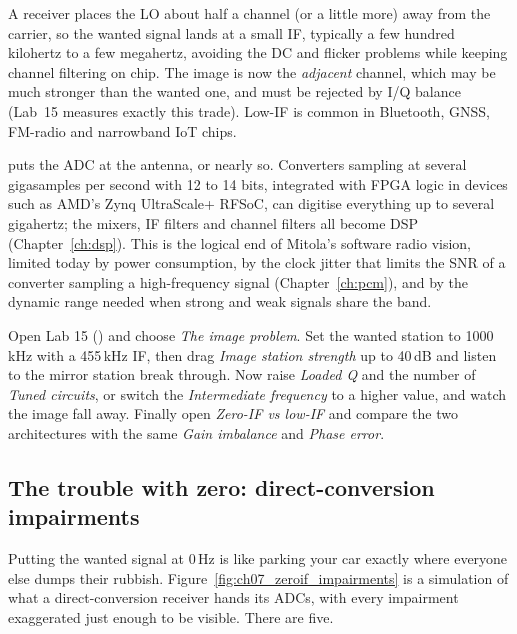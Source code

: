 A  receiver places the LO about half a channel (or a little more) away from the carrier, so
the wanted signal lands at a small IF, typically a few hundred kilohertz to a few megahertz, avoiding
the DC and flicker problems while keeping channel filtering on chip. The image is now the
\emph{adjacent} channel, which may be much stronger than the wanted one, and must be rejected by I/Q
balance (Lab~15 measures exactly this trade). Low-IF is common in Bluetooth, GNSS, FM-radio and
narrowband IoT chips.

 puts the ADC at the antenna, or nearly so. Converters sampling at several
gigasamples per second with 12 to 14 bits, integrated with FPGA logic in devices such as AMD's
Zynq UltraScale+ RFSoC, can digitise everything up to several gigahertz; the mixers, IF filters and
channel filters all become DSP (Chapter~\ref{ch:dsp}). This is the logical end of Mitola's software radio
vision, limited today by power consumption, by the clock jitter that limits the SNR of a converter
sampling a high-frequency signal (Chapter~\ref{ch:pcm}), and by the dynamic range needed when strong and
weak signals share the band.

\begin{tryit}
Open Lab 15 () and choose \emph{The image problem}. Set the wanted
station to 1000\,kHz with a 455\,kHz IF, then drag \emph{Image station strength} up to 40\,dB and
listen to the mirror station break through. Now raise \emph{Loaded Q} and the number of
\emph{Tuned circuits}, or switch the \emph{Intermediate frequency} to a higher value, and watch the
image fall away. Finally open \emph{Zero-IF vs low-IF} and compare the two architectures with the same
\emph{Gain imbalance} and \emph{Phase error}.
\end{tryit}

\subsection{The trouble with zero: direct-conversion impairments}
\label{sec:ch07:zeroif}

Putting the wanted signal at 0\,Hz is like parking your car exactly where everyone else dumps their
rubbish. Figure~\ref{fig:ch07_zeroif_impairments} is a simulation of what a direct-conversion receiver
hands its ADCs, with every impairment exaggerated just enough to be visible. There are five.


